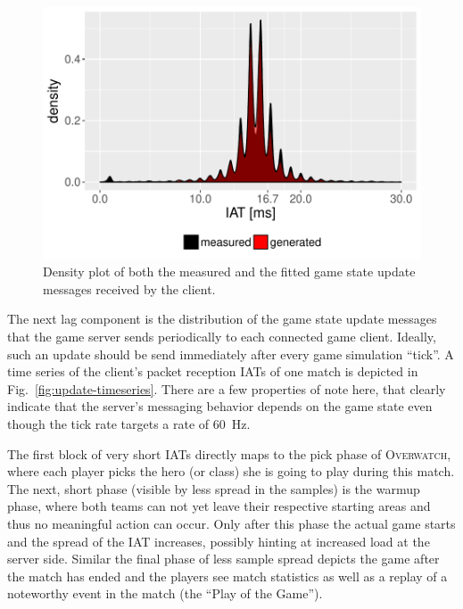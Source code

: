 	\begin{figure}[t]
		\centering
		\includegraphics[width=1.0\columnwidth]{images/update-density.pdf}
		\caption{Density plot of both the measured and the fitted game state update messages received by the client.}
	\label{fig:update-density}
	\end{figure}

	The next lag component is the distribution of the game state update messages that the game server sends periodically to each connected game client. Ideally, such an update should be send immediately after every game simulation ``tick''. A time series of the client's packet reception \glspl{IAT} of one match is depicted in Fig.~\ref{fig:update-timeseries}. There are a few properties of note here, that clearly indicate that the server's messaging behavior depends on the game state even though the tick rate targets a rate of \SI{60}{\hertz}. 

	The first block of very short \glspl{IAT} directly maps to the pick phase of \textsc{Overwatch}, where each player picks the hero (or class) she is going to play during this match. The next, short phase (visible by less spread in the samples) is the warmup phase, where both teams can not yet leave their respective starting areas and thus no meaningful action can occur. Only after this phase the actual game starts and the spread of the \gls{IAT} increases, possibly hinting at increased load at the server side. Similar the final phase of less sample spread depicts the game after the match has ended and the players see match statistics as well as a replay of a noteworthy event in the match (the ``Play of the Game'').

